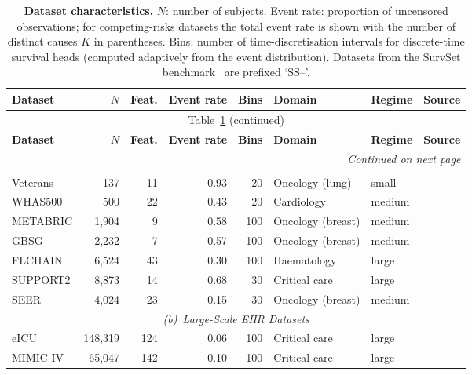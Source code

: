 \begin{longtable}{lrrrrlll}
\caption{\textbf{Dataset characteristics.} $N$: number of subjects. Event rate: proportion of uncensored observations; for competing-risks datasets the total event rate is shown with the number of distinct causes $K$ in parentheses. Bins: number of time-discretisation intervals for discrete-time survival heads (computed adaptively from the event distribution). Datasets from the SurvSet benchmark~\cite{drysdale2022survset} are prefixed `SS--'.} \label{tab:datasets_all} \\
\toprule
\textbf{Dataset} & \textbf{$N$} & \textbf{Feat.} & \textbf{Event rate} & \textbf{Bins} & \textbf{Domain} & \textbf{Regime} & \textbf{Source} \\
\midrule
\endfirsthead
\multicolumn{8}{c}{Table~\ref{tab:datasets_all} (continued)} \\
\toprule
\textbf{Dataset} & \textbf{$N$} & \textbf{Feat.} & \textbf{Event rate} & \textbf{Bins} & \textbf{Domain} & \textbf{Regime} & \textbf{Source} \\
\midrule
\endhead
\midrule
\multicolumn{8}{r}{\textit{Continued on next page}} \\
\endfoot
\bottomrule
\endlastfoot
\multicolumn{8}{c}{\textit{(a)~Standard Public Benchmarks}} \\
\midrule
Veterans & 137 & 11 & 0.93 & 20 & Oncology (lung) & small & \cite{prentice1973exponential} \\
WHAS500 & 500 & 22 & 0.43 & 20 & Cardiology & medium & \cite{hosmer2008applied} \\
METABRIC & 1,904 & 9 & 0.58 & 100 & Oncology (breast) & medium & \cite{curtis2012genomic} \\
GBSG & 2,232 & 7 & 0.57 & 100 & Oncology (breast) & medium & \cite{schumacher1994randomized} \\
FLCHAIN & 6,524 & 43 & 0.30 & 100 & Haematology & large & \cite{dispenzieri2012use} \\
SUPPORT2 & 8,873 & 14 & 0.68 & 30 & Critical care & large & \cite{knaus1995support} \\
SEER & 4,024 & 23 & 0.15 & 30 & Oncology (breast) & medium & \cite{nci2023seer} \\
\midrule
\multicolumn{8}{c}{\textit{(b)~Large-Scale EHR Datasets}} \\
\midrule
eICU & 148,319 & 124 & 0.06 & 100 & Critical care & large & \cite{pollard2018eicu} \\
MIMIC-IV & 65,047 & 142 & 0.10 & 100 & Critical care & large & \cite{johnson2023mimiciv} \\

\end{longtable}

